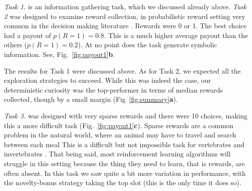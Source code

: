 \begin{figure}
\begin{fullwidth}
	\end{fullwidth}
\end{figure}

\textit{Task 1.} is an information gathering task, which we discussed already above. \textit{Task 2} was designed to examine reward collection, in probabilistic reward setting very common in the decision making literature \citep{schonberg2007reinforcement,frank2004carrot,cavanagh2014conflict,jahfari2019cross,collins2014opponent,collins2017interactions,glascher2010states}. Rewards were 0 or 1. The best choice had a payout of $p(R=1) = 0.8$. This is a much higher average payout than the others ($p(R=1) = 0.2$). At no point does the task generate symbolic information. See, Fig.~\ref{fig:payout1}\textbf{b}. 

The results for Task 1 were discussed above. As for Task 2, we expected all the exploration strategies to succeed. While this was indeed the case, our deterministic curiosity was the top-performer in terms of median rewards collected, though by a small margin (Fig~\ref{fig:summary}\textbf{a}).

\textit{Task 3.} was designed with very sparse rewards \citep{Mniha,Silver2016b,Silver2018} and there were 10 choices, making this a more difficult task (Fig.~\ref{fig:payout1}\textbf{c}). Sparse rewards are a common problem in the natural world, where an animal may have to travel and search between each meal This is a difficult but not impossible task for vertebrates \citep{anderson1984optimal} and invertebrates \citep{westphal2006foraging}. That being said, most reinforcement learning algorithms will struggle in this setting because the thing they need to learn, that is rewards, are often absent. In this task we saw quite a bit more variation in performance, with the novelty-bonus strategy taking the top slot (this is the only time it does so).

